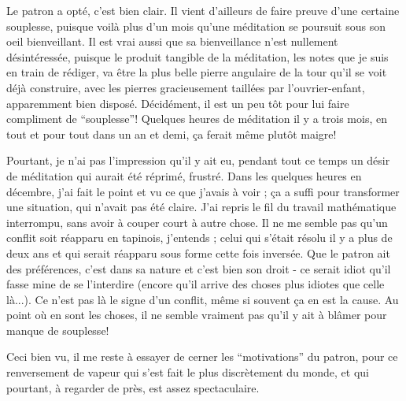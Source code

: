 Le patron a opté, c'est bien clair. Il vient d'ailleurs de faire preuve d'une certaine souplesse, puisque voilà plus d'un mois qu'une méditation se poursuit sous son oeil bienveillant. Il est vrai aussi que sa bienveillance n'est nullement désintéressée, puisque le produit tangible de la méditation, les notes que je suis en train de rédiger, va être la plus belle pierre angulaire de la tour qu'il se voit déjà construire, avec les pierres gracieusement taillées par l'ouvrier-enfant, apparemment bien disposé. Décidément, il est un peu tôt pour lui faire compliment de ``souplesse''! Quelques heures de méditation il y a trois mois, en tout et pour tout dans un an et demi, ça ferait même plutôt maigre!

Pourtant, je n'ai pas l'impression qu'il y ait eu, pendant tout ce temps un désir de méditation qui aurait été réprimé, frustré. Dans les quelques heures en décembre, j'ai fait le point et vu ce que j'avais à voir ; ça a suffi pour transformer une situation, qui n'avait pas été claire. J'ai repris le fil du travail mathématique interrompu, sans avoir à couper court à autre chose. Il ne me semble pas qu'un conflit soit réapparu en tapinois, j'entends ; celui qui s'était résolu il y a plus de deux ans et qui serait réapparu sous forme cette fois inversée. Que le patron ait des préférences, c'est dans sa nature et c'est bien son droit - ce serait idiot qu'il fasse mine de se l'interdire (encore qu'il arrive des choses plus idiotes que celle là...). Ce n'est pas là le signe d'un conflit, même si souvent ça en est la cause. Au point où en sont les choses, il ne semble vraiment pas qu'il y ait à blâmer pour manque de souplesse!

Ceci bien vu, il me reste à essayer de cerner les ``motivations'' du patron, pour ce renversement de vapeur qui s'est fait le plus discrètement du monde, et qui pourtant, à regarder de près, est assez spectaculaire.